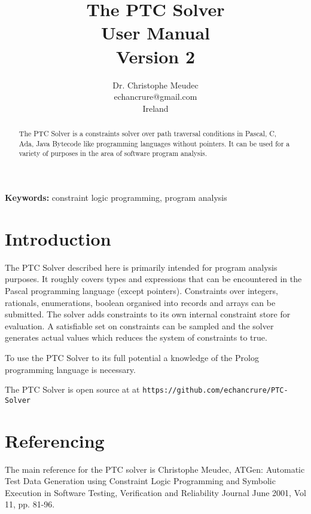 \documentclass{article}
\begin{document}
\title{The PTC Solver\\
       User Manual\\
       Version 2}
\author{Dr. Christophe Meudec \\
        echancrure@gmail.com \\
        Ireland}
\maketitle

\begin{abstract}
The PTC Solver is a constraints solver over path traversal conditions in Pascal,
C, Ada, Java Bytecode like programming languages without pointers. It
can be used for a variety of purposes in the area of software program analysis.
\end{abstract}


\noindent\textbf{Keywords:} constraint logic programming, program analysis

\section{Introduction}

The PTC Solver described here is primarily intended for program analysis
purposes.
It roughly covers types and expressions that can be encountered in the Pascal
programming language (except pointers). Constraints over integers, rationals,
enumerations, boolean organised into records and arrays can be submitted. The
solver adds constraints to its own internal constraint store for evaluation. A
satisfiable set on constraints can be sampled and the solver generates actual
values which reduces the system of constraints to true.

To use the PTC Solver to its full potential a knowledge of the Prolog programming language is necessary.

The PTC Solver is open source at at \texttt{https://github.com/echancrure/PTC-Solver}

\section{Referencing}

The main reference for the PTC solver is Christophe Meudec,
ATGen: Automatic Test Data Generation using Constraint Logic Programming and
Symbolic Execution
in Software Testing, Verification and Reliability Journal
June 2001, Vol 11, pp. 81-96.
\end{document}
